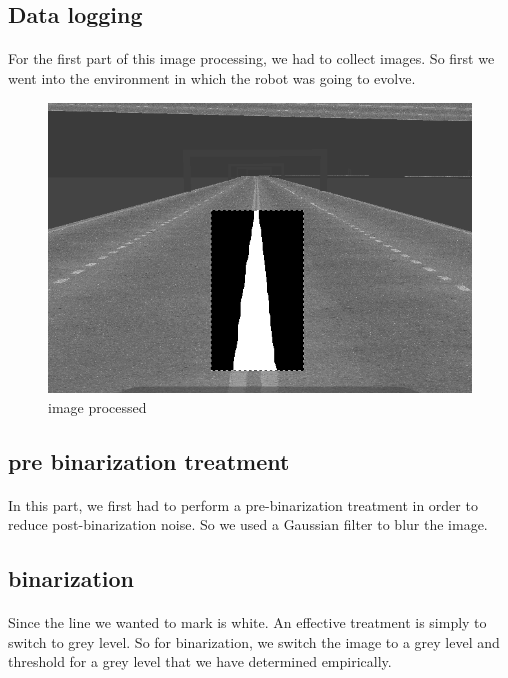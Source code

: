 \subsection{Data logging}
\paragraph{}
For the first part of this image processing, we had to collect images.
So first we went into the environment in which the robot was going to evolve.

\begin{figure}[ht!]
    \begin{center}
        \includegraphics[scale=0.3]{Images/image_process.png}
    \end{center}
    \caption{image processed}
    \label{fig:img_processing}
\end{figure}

\subsection{pre binarization treatment}
\paragraph{}
In this part, we first had to perform a pre-binarization treatment in order to reduce post-binarization noise.
So we used a Gaussian filter to blur the image.

\subsection{binarization}
\paragraph{}
Since the line we wanted to mark is white. An effective treatment is simply to switch to grey level. 
So for binarization, we switch the image to a grey level and threshold for a grey level that we have determined empirically.

